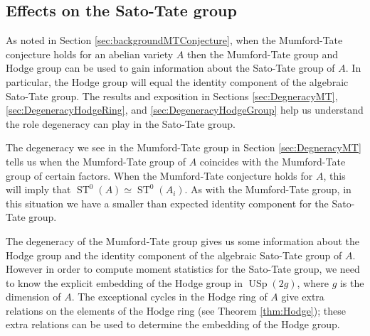 \documentclass[reqno, oneside, 12pt]{amsart}
\DeclareMathOperator{\USp}{USp}
\DeclareMathOperator{\ST}{ST}
\theoremstyle{remark}
\numberwithin{equation}{section}
\begin{document}
\subsection{Effects on the Sato-Tate group}\label{sec:DegeneracyST}
As noted in Section \ref{sec:backgroundMTConjecture}, when the Mumford-Tate conjecture holds for an abelian variety $A$ then the Mumford-Tate group and Hodge group can be used to gain information about the Sato-Tate group of $A$. In particular, the Hodge group will equal the identity component of the algebraic Sato-Tate group. The results and exposition in Sections \ref{sec:DegneracyMT}, \ref{sec:DegeneracyHodgeRing}, and \ref{sec:DegeneracyHodgeGroup} help us understand the role degeneracy can play in the Sato-Tate group.

The degeneracy we see in the Mumford-Tate group in Section \ref{sec:DegneracyMT} tells us when the Mumford-Tate group of $A$ coincides with the Mumford-Tate group of certain factors. When the Mumford-Tate conjecture holds for $A$, this will imply that $\ST^0(A)\simeq \ST^0(A_i)$. As with the Mumford-Tate group, in this situation we have a smaller than expected identity component for the Sato-Tate group.

The degeneracy of the Mumford-Tate group gives us some information about the Hodge group and the identity component of the algebraic Sato-Tate group of $A$. However in order to compute moment statistics for the Sato-Tate group, we need to know the explicit embedding of the Hodge group in $\USp(2g)$, where $g$ is the dimension of $A$. The exceptional cycles in the Hodge ring of $A$ give extra relations on the elements of the Hodge ring (see Theorem \ref{thm:Hodge}); these extra relations can be used to determine the embedding of the Hodge group.
\end{document}
